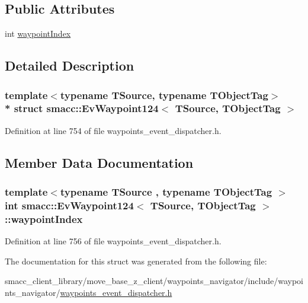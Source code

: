 \subsection*{Public Attributes}
\begin{DoxyCompactItemize}
\item 
int \hyperlink{structsmacc_1_1EvWaypoint124_a6258462f0e7a663e1710244816701ab7}{waypoint\+Index}
\end{DoxyCompactItemize}


\subsection{Detailed Description}
\subsubsection*{template$<$typename T\+Source, typename T\+Object\+Tag$>$\\*
struct smacc\+::\+Ev\+Waypoint124$<$ T\+Source, T\+Object\+Tag $>$}



Definition at line 754 of file waypoints\+\_\+event\+\_\+dispatcher.\+h.



\subsection{Member Data Documentation}
\subsubsection[{\texorpdfstring{waypoint\+Index}{waypointIndex}}]{\setlength{\rightskip}{0pt plus 5cm}template$<$typename T\+Source , typename T\+Object\+Tag $>$ int {\bf smacc\+::\+Ev\+Waypoint124}$<$ T\+Source, T\+Object\+Tag $>$\+::waypoint\+Index}\hypertarget{structsmacc_1_1EvWaypoint124_a6258462f0e7a663e1710244816701ab7}{}\label{structsmacc_1_1EvWaypoint124_a6258462f0e7a663e1710244816701ab7}


Definition at line 756 of file waypoints\+\_\+event\+\_\+dispatcher.\+h.



The documentation for this struct was generated from the following file\+:\begin{DoxyCompactItemize}
\item 
smacc\+\_\+client\+\_\+library/move\+\_\+base\+\_\+z\+\_\+client/waypoints\+\_\+navigator/include/waypoints\+\_\+navigator/\hyperlink{waypoints__event__dispatcher_8h}{waypoints\+\_\+event\+\_\+dispatcher.\+h}\end{DoxyCompactItemize}
